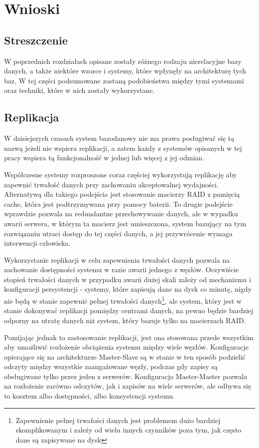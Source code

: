 \chapter{Wnioski}

\section*{Streszczenie}

W poprzednich rozdziałach opisane zostały różnego rodzaju nierelacyjne bazy danych, a także niektóre wzorce i systemy, które wpłynęły na architekturę tych baz.
W tej części podsumowane zostaną podobieństwa między tymi systemami oraz techniki, które w nich zostały wykorzystane. 

\section{Replikacja}

W dzisiejszych czasach system bazodanowy nie ma prawa posługiwać się tą nazwą jeżeli nie wspiera replikacji, a zatem każdy z systemów opisanych w tej pracy wspiera tą funkcjonalność w jednej lub więcej z jej odmian.

Współczesne systemy rozproszone coraz częściej wykorzystują replikację aby zapewnić trwałość danych przy zachowaniu akceptowalnej wydajności.
Alternatywą dla takiego podejścia jest stosowanie macierzy RAID z pamięcią cache, która jest podtrzymywana przy pomocy baterii.
To drugie podejście wprawdzie pozwala na redundantne przechowywanie danych, ale w wypadku awarii serwera, w którym ta macierz jest umieszczona, system bazujący na tym rozwiązaniu utraci dostęp do tej części danych, a jej przywrócenie wymaga interwencji człowieka.

Wykorzystanie replikacji w celu zapewnienia trwałości danych pozwala na zachowanie dostępności systemu w razie awarii jednego z węzłów.
Oczywiście stopień trwałości danych w przypadku awarii dużej skali zależy od mechanizmu i konfiguracji persystencji - systemy, które zapisują dane na dysk co minutę, nigdy nie będą w stanie zapewnić pełnej trwałości danych\footnote{Zapewnienie pełnej trwałości danych jest problemem dużo bardziej skomplikowanym i zależy od wielu innych czynników poza tym, jak często dane są zapisywane na dysk}, ale system, który jest w stanie dokonywać replikacji pomiędzy centrami danych, na pewno będzie bardziej odporny na utratę danych niż system, który bazuje tylko na macierzach RAID.

Pomijając jednak to zastosowanie replikacji, jest ona stosowana przede wszystkim aby umożliwić rozłożenie obciążenia systemu między wiele węzłów.
Konfiguracje opierające się na architekturze Master-Slave są w stanie w ten sposób podzielić odczyty między wszystkie zaangażowane węzły, podczas gdy zapisy są obsługiwane tylko przez jeden z serwerów.
Konfiguracja Master-Master pozwala na rozłożenie zarówno odczytów, jak i zapisów na wiele serwerów, ale odbywa się to kosztem albo dostępności, albo konsystencji systemu.

